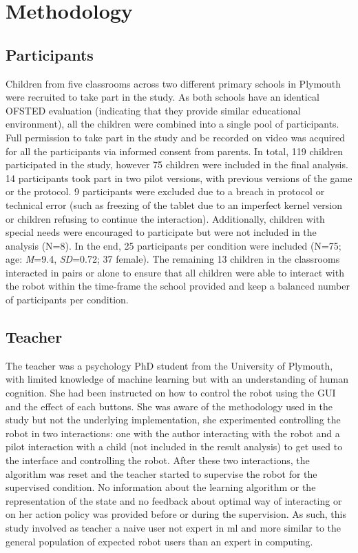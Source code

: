 \section{Methodology}

\subsection{Participants}

Children from five classrooms across two different primary schools in Plymouth were recruited to take part in the study. As both schools have an identical OFSTED evaluation (indicating that they provide similar educational environment), all the children were combined into a single pool of participants. Full permission to take part in the study and be recorded on video was acquired for all the participants via informed consent from parents. In total, 119 children participated in the study, however 75 children were included in the final analysis. 14 participants took part in two pilot versions, with previous versions of the game or the protocol. 9 participants were excluded due to a breach in protocol or technical error (such as freezing of the tablet due to an imperfect kernel version or children refusing to continue the interaction). Additionally, children with special needs were encouraged to participate but were not included in the analysis (N=8). In the end, 25 participants per condition were included (N=75; age: \textit{M}=9.4, \textit{SD}=0.72; 37 female). The remaining 13 children in the classrooms interacted in pairs or alone to ensure that all children were able to interact with the robot within the time-frame the school provided and keep a balanced number of participants per condition. 

\subsection{Teacher}
The teacher was a psychology PhD student from the University of Plymouth, with limited knowledge of machine learning but with an understanding of human cognition. She had been instructed on how to control the robot using the GUI and the effect of each buttons. She was aware of the methodology used in the study but not the underlying implementation, she experimented controlling the robot in two interactions: one with the author interacting with the robot and a pilot interaction with a child (not included in the result analysis) to get used to the interface and controlling the robot. After these two interactions, the algorithm was reset and the teacher started to supervise the robot for the supervised condition. No information about the learning algorithm or the representation of the state and no feedback about optimal way of interacting or on her action policy was provided before or during the supervision. As such, this study involved as teacher a naive user not expert in \gls{ml} and more similar to the general population of expected robot users than an expert in computing.

